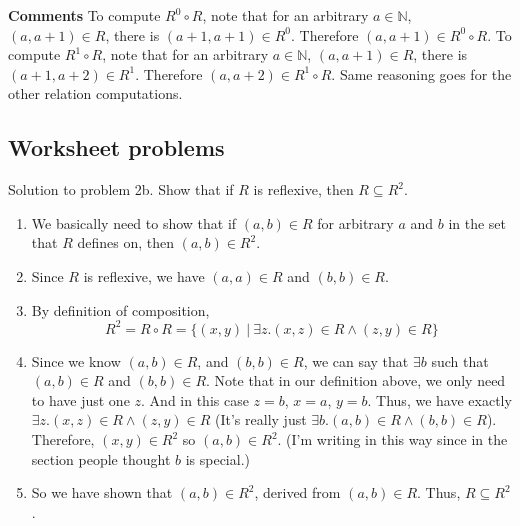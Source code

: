 \documentclass[10pt]{article}
\begin{document}
\begin{enumerate}
\begin{enumerate}[label=\roman*)]
       \qquad \textbf{Comments } To compute $R^0\circ R$, note that for an arbitrary $a\in\mathbb{N}$, $(a,a+1)\in R$, there is $(a+1,a+1)\in R^0$. Therefore $(a,a+1)\in R^0\circ R$.
      To compute $R^1\circ R$, note that for an arbitrary $a\in\mathbb{N}$, $(a,a+1)\in R$, there is $(a+1,a+2)\in R^1$. Therefore $(a,a+2)\in R^1\circ R$. Same reasoning goes for the other relation computations.

        
    \end{enumerate}
\end{enumerate}

\subsection{Worksheet problems}
Solution to problem 2b. Show that if $R$ is reflexive, then $R\subseteq R^2$.
\begin{enumerate}
  \item We basically need to show that if $(a, b)\in R$ for arbitrary $a$ and $b$ in the set that $R$ defines on, then $(a, b)\in R^2$.
  \item Since $R$ is reflexive, we have $(a, a)\in R$ and $(b, b)\in R$.
  \item By definition of composition, $$R^2=R\circ R=\{(x, y)\ |\ \exists z. (x, z)\in R \land (z, y) \in R\}$$
  \item Since we know $(a, b)\in R$, and $(b, b) \in R$, we can say that $\exists b$ such that $(a, b)\in R$ and $(b, b) \in R$. Note that in our definition above, we only need to have just one $z$. And in this case $z=b$, $x=a$, $y=b$. Thus, we have exactly $\exists z. (x, z)\in R \land (z, y) \in R$ (It's really just $\exists b. (a, b)\in R \land (b, b) \in R$). Therefore, $(x, y)\in R^2$ so $(a,b)\in R^2$. (I'm writing in this way since in the section people thought $b$ is special.)
  \item So we have shown that $(a,b)\in R^2$, derived from $(a, b)\in R$. Thus, $R\subseteq R^2$.
\end{enumerate}
\end{document}
